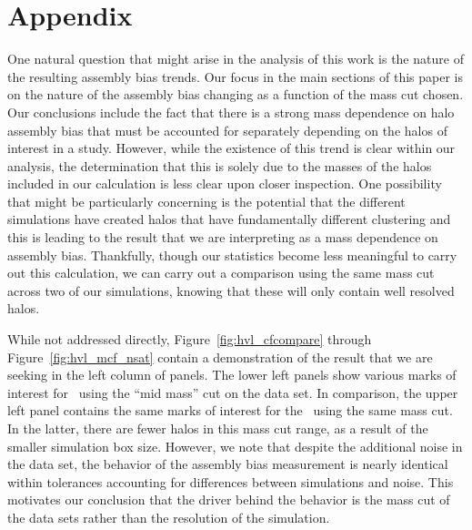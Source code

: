 \documentclass[usenatbib,fleqn]{mnras}
\begin{document}



\section*{Appendix}
\label{section:appendix_massres}
One natural question that might arise in the analysis of this work is the nature of the resulting assembly bias
trends. Our focus in the main sections of this paper is on the nature of the assembly bias changing as a function
of the mass cut chosen. Our conclusions include the fact that there is a strong mass dependence on halo assembly
bias that must be accounted for separately depending on the halos of interest in a study. However, while the
existence of this trend is clear within our analysis, the determination that this is solely due to the masses of
the halos included in our calculation is less clear upon closer inspection. One possibility that might be
particularly concerning is the potential that the different simulations have created halos that have
fundamentally different clustering and this is leading to the result that we are interpreting as a mass
dependence on assembly bias. Thankfully, though our statistics become less meaningful to carry out this
calculation, we can carry out a comparison using the same mass cut across two of our simulations, knowing that
these will only contain well resolved halos.

While not addressed directly, Figure~\ref{fig:hvl_cfcompare} through Figure~\ref{fig:hvl_mcf_nsat}  contain a
demonstration of the result that we are seeking in the left column of panels. The lower left panels show various
marks of interest for \simB \ using the ``mid mass'' cut on the data set. In comparison, the upper left panel
contains the same marks of interest for the \simA \ using the same mass cut. In the latter, there are fewer halos
in this mass cut range, as a result of the smaller simulation box size. However, we note that despite the
additional noise in the data set, the behavior of the assembly bias measurement is nearly identical within
tolerances accounting for differences between simulations and noise. This motivates our conclusion that the
driver behind the behavior is the mass cut of the data sets rather than the resolution of the simulation.

\label{lastpage}
\end{document}
